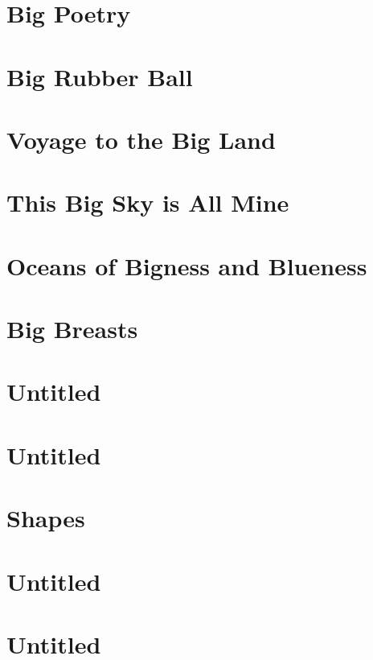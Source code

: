 \documentclass[oneside,14pt]{memoir} %
\newcommand{\chapterXIIvar}{poem/big_poetry.tex}
\newcommand{\chapterXIIIvar}{poem/big_rubber_ball.tex}
\newcommand{\chapterXVIvar}{poem/voyage_to_the_big_land.tex}
\newcommand{\chapterXVIIvar}{poem/this_big_sky_is_all_mine.tex}
\newcommand{\chapterXVIIIvar}{poem/oceans_of_bigness_and_blueness.tex}
\newcommand{\chapterXXvar}{poem/big_breasts.tex}
\newcommand{\chapterXXIvar}{poem/untitled_4.tex}
\newcommand{\chapterXXIVvar}{poem/untitled_5.tex}
\newcommand{\chapterXXVvar}{poem/shapes.tex}
\newcommand{\chapterXXVIvar}{poem/untitled_6.tex}
\newcommand{\chapterXXVIIIvar}{poem/untitled_7.tex}
\begin{document}
\chapter{Big Poetry}


\chapter{Big Rubber Ball}


\chapter{Voyage to the Big Land}


\chapter{This Big Sky is All Mine}


\chapter{Oceans of Bigness and Blueness}


\chapter{Big Breasts}


\chapter{Untitled}



\chapter{Untitled}


\chapter{Shapes}


\chapter{Untitled}


\chapter{Untitled}

\end{document}
